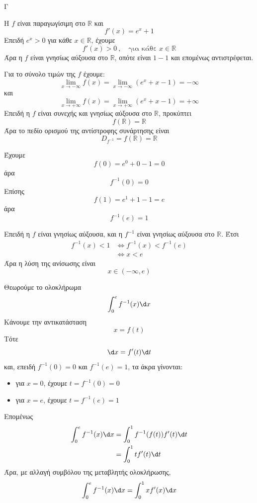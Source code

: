 \begin{thema}{Γ}
\begin{erwthma}
\item Η $f$ είναι παραγωγίσιμη στο $\mathbb{R}$ και
\[f'(x)=e^x+1\]
Επειδή $e^x>0$ για κάθε $x\in\mathbb{R}$, έχουμε
\[f'(x)>0\ ,\quad \text{για κάθε }x\in\mathbb{R}\]
Άρα η $f$ είναι γνησίως αύξουσα στο $\mathbb{R}$, οπότε είναι $1-1$ και επομένως αντιστρέφεται.

Για το σύνολο τιμών της $f$ έχουμε:
\[\lim\limits_{x\to-\infty}f(x)=\lim\limits_{x\to-\infty}(e^x+x-1)=-\infty\]
και
\[\lim\limits_{x\to+\infty}f(x)=\lim\limits_{x\to+\infty}(e^x+x-1)=+\infty\]
Επειδή η $f$ είναι συνεχής και γνησίως αύξουσα στο $\mathbb{R}$, προκύπτει
\[f(\mathbb{R})=\mathbb{R}\]
Άρα το πεδίο ορισμού της αντίστροφης συνάρτησης είναι
\[D_{f^{-1}}=f(\mathbb{R})=\mathbb{R}\]

\item Έχουμε
\[f(0)=e^0+0-1=0\]
άρα
\[f^{-1}(0)=0\]
Επίσης
\[f(1)=e^1+1-1=e\]
άρα
\[f^{-1}(e)=1\]

Επειδή η $f$ είναι γνησίως αύξουσα, και η $f^{-1}$ είναι γνησίως αύξουσα στο $\mathbb{R}$.
Έτσι
\begin{align*}
f^{-1}(x)<1
&\Leftrightarrow f^{-1}(x)<f^{-1}(e)\\
&\Leftrightarrow x<e
\end{align*}
Άρα η λύση της ανίσωσης είναι
\[x\in(-\infty,e)\]

\item Θεωρούμε το ολοκλήρωμα
\[\dint_0^e f^{-1}(x)\d x\]
Κάνουμε την αντικατάσταση
\[x=f(t)\]
Τότε
\[\d x=f'(t)\d t\]
και, επειδή $f^{-1}(0)=0$ και $f^{-1}(e)=1$, τα άκρα γίνονται:
\begin{itemize}
\item για $x=0$, έχουμε $t=f^{-1}(0)=0$
\item για $x=e$, έχουμε $t=f^{-1}(e)=1$
\end{itemize}
Επομένως
\begin{align*}
\dint_0^e f^{-1}(x)\d x
&=\dint_0^1 f^{-1}(f(t))f'(t)\d t\\
&=\dint_0^1 t f'(t)\d t
\end{align*}
Άρα, με αλλαγή συμβόλου της μεταβλητής ολοκλήρωσης,
\[\dint_0^e f^{-1}(x)\d x=\dint_0^1 x f'(x)\d x\]


\end{erwthma}
\end{thema}
